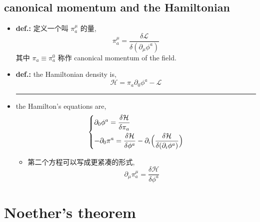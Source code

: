 \subsection{canonical momentum and the Hamiltonian}
\begin{itemize}
	\item \textbf{def.:} 定义一个叫 $\pi_a^\mu$ 的量,
	\begin{equation}
		\pi_a^\mu = \frac{\delta \mathcal{L}}{\delta (\partial_\mu \phi^a)}
	\end{equation}
	其中 $\pi_a \equiv \pi_a^0$ 称作 canonical momentum of the field.
	
	\item \textbf{def.:} the Hamiltonian density is,
	\begin{equation}
		\mathcal{H} = \pi_a \partial_0 \phi^a - \mathcal{L}
	\end{equation}
	
	\noindent\rule[0.5ex]{\linewidth}{0.5pt} %
	
	\item the Hamilton's equations are,
	\begin{equation}
		\begin{dcases}
			\partial_0 \phi^a = \frac{\delta \mathcal{H}}{\delta \pi_a} \\
			- \partial_0 \pi^a = \frac{\delta \mathcal{H}}{\delta \phi^a} - \partial_i \Big( \frac{\delta \mathcal{H}}{\delta (\partial_i \phi^a)} \Big)
		\end{dcases}
	\end{equation}
	\begin{itemize}
		\item 第二个方程可以写成更紧凑的形式,
		\begin{equation}
			\partial_\mu \pi_a^\mu = \frac{\delta \mathcal{H}}{\delta \phi^a}
		\end{equation}
	\end{itemize}
\end{itemize}

\section{Noether's theorem} \label{D.2}
